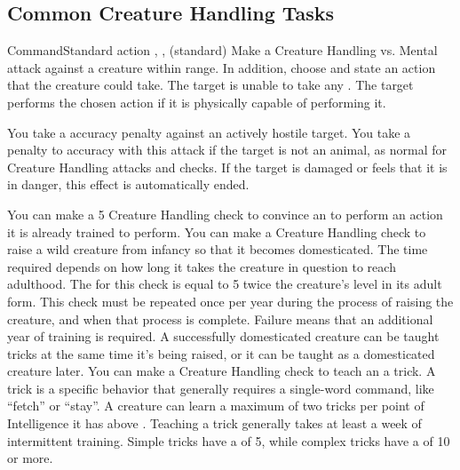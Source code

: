   \subsection{Common Creature Handling Tasks}

    \begin{sustainability}{Command}{Standard action}
      \abilitytags {}, ,  (standard)
      \rankline
      Make a Creature Handling vs. Mental attack against a creature within \rngmed range.
      In addition, choose and state an action that the creature could take.
      \hit The target is unable to take any .
      \crit The target performs the chosen action if it is physically capable of performing it.

      You take a  accuracy penalty against an actively hostile target.
      You take a  penalty to accuracy with this attack if the target is not an animal, as normal for Creature Handling attacks and checks.
      If the target is damaged or feels that it is in danger, this effect is automatically ended.
    \end{sustainability}
     You can make a  5 Creature Handling check to convince an  to perform an action it is already trained to perform.
     You can make a Creature Handling check to raise a wild creature from infancy so that it becomes domesticated.
    The time required depends on how long it takes the creature in question to reach adulthood.
    The  for this check is equal to 5 \add twice the creature's level in its adult form.
    This check must be repeated once per year during the process of raising the creature, and when that process is complete.
    Failure means that an additional year of training is required.
    A successfully domesticated creature can be taught tricks at the same time it's being raised, or it can be taught as a domesticated creature later.
     You can make a Creature Handling check to teach an  a trick.
    A trick is a specific behavior that generally requires a single-word command, like ``fetch'' or ``stay''.
    A creature can learn a maximum of two tricks per point of Intelligence it has above .
    Teaching a trick generally takes at least a week of intermittent training.
    Simple tricks have a  of 5, while complex tricks have a  of 10 or more.

